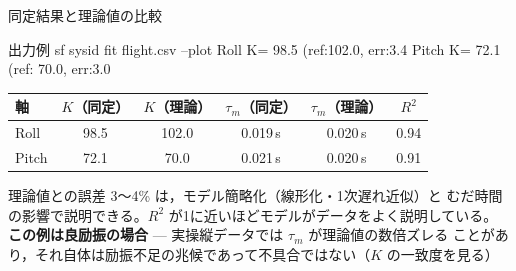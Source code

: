 \begin{frame}[fragile]{同定結果と理論値の比較}
  \begin{sflisting}[basicstyle=\ttfamily\scriptsize]{出力例}
sf sysid fit flight.csv --plot
  Roll  K= 98.5 (ref:102.0, err:3.4%
  Pitch K= 72.1 (ref: 70.0, err:3.0%
  \end{sflisting}

  \vspace{0.3em}

  \begin{table}
    \centering\footnotesize
    \begin{tabular}{lccccc}
      \hline
      \textbf{軸} & \textbf{$K$（同定）} & \textbf{$K$（理論）} & \textbf{$\tau_m$（同定）} & \textbf{$\tau_m$（理論）} & \textbf{$R^2$} \\
      \hline
      Roll  & 98.5 & 102.0 & 0.019\,s & 0.020\,s & 0.94 \\
      Pitch & 72.1 &  70.0 & 0.021\,s & 0.020\,s & 0.91 \\
      \hline
    \end{tabular}
  \end{table}

  \vspace{0.3em}

  {\footnotesize 理論値との誤差 3〜4\% は，モデル簡略化（線形化・1次遅れ近似）と
  むだ時間の影響で説明できる。$R^2$ が1に近いほどモデルがデータをよく説明している。
  \textbf{この例は良励振の場合} — 実操縦データでは $\tau_m$ が理論値の数倍ズレる
  ことがあり，それ自体は励振不足の兆候であって不具合ではない（$K$ の一致度を見る）}
\end{frame}


